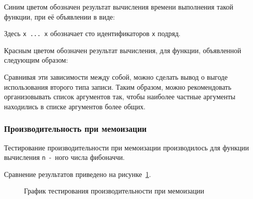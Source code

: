         Синим цветом обозначен результат вычисления времени выполнения такой функции, при её объявлении в виде:
        
        Здесь \verb,x ... x, обозначает сто идентификаторов \verb,x, подряд.

        Красным цветом обозначен результат вычисления, для функции, объявленной следующим образом:
        

        Сравнивая эти зависимости между собой, можно сделать вывод о выгоде использования второго типа записи.
        Таким образом, можно рекомендовать организовывать список аргументов так, чтобы наиболее частные аргументы находились в списке аргументов более общих.
        \subsubsection{Производительность при мемоизации}

        Тестирование производительности при мемоизации производилось для функции вычисления \verb,n,~-~ного числа фибоначчи.

        

        Сравнение результатов приведено на рисунке~\ref{pic:memo}.

        \clearpage
        \begin{figure}[Ht!]
            \centering
            \caption{График тестирования производительности при мемоизации}
            \label{pic:memo}
        \end{figure}

